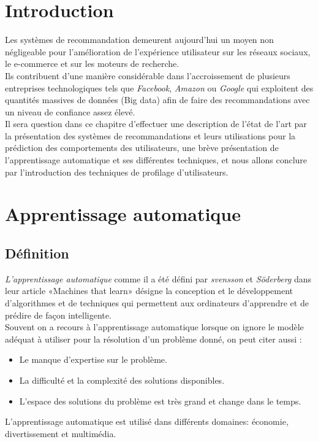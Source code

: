 
\newpage

\section{Introduction}
Les systèmes de recommandation demeurent aujourd'hui un moyen non négligeable pour l'amélioration de l’expérience utilisateur sur les réseaux sociaux, le e-commerce et sur les moteurs de recherche.\\
Ils contribuent d'une manière considérable dans l'accroissement de plusieurs entreprises technologiques tels que \emph{Facebook}, \emph{Amazon} ou \emph{Google} qui exploitent des quantités massives de données (Big data) afin de faire des recommandations avec un niveau de confiance assez élevé.\\
Il sera question dans ce chapitre d’effectuer une description de l'état de l'art par la présentation des systèmes de recommandations et leurs utilisations pour la prédiction des comportements des utilisateurs, une brève présentation de l'apprentissage automatique et ses différentes techniques, et nous allons conclure par l'introduction des techniques de profilage d'utilisateurs.

\section{Apprentissage automatique}
    \subsection{Définition}
    \emph{L'apprentissage automatique} comme il a été défini par \emph{svensson} et \emph{Söderberg} dans leur article «Machines that learn»\cite{svensson} désigne la conception et le développement d'algorithmes et de techniques qui permettent aux ordinateurs d'apprendre et de prédire de façon intelligente.\\
    Souvent on a recours à l'apprentissage automatique lorsque on ignore le modèle adéquat à utiliser pour la résolution d'un problème donné, on peut citer aussi :
    \begin{itemize}
        \item Le manque d'expertise sur le problème.
        \item La difficulté et la complexité des solutions disponibles. 
        \item L'espace des solutions du problème est très grand et change dans le temps. 
    \end{itemize}
    L'apprentissage automatique est utilisé dans différents domaines: économie, divertissement et multimédia.

